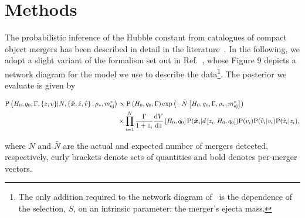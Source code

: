 \documentclass[%
 reprint,
 superscriptaddress,
 nofootinbib,
 amsmath,amssymb,
 aps,
]{revtex4-2}
\newcommand{\hubble}{\ensuremath{H_0}}
\newcommand{\decel}{\ensuremath{q_0}}
\newcommand{\prob}{\ensuremath{{\rm P}}}
\newcommand{\nexp}{\bar{N}}
\newcommand{\snrmin}{\rho_*}
\newcommand{\mejmin}{m_{\rm ej}^*}
\newcommand{\dgw}{\hat{\bm{x}}}
\begin{document}

\section{Methods} \label{sec:methods}

The probabilistic inference of the Hubble constant from catalogues of compact object mergers has been described in detail in the literature~\cite{Schutz:1986,Dalal:2006,Nissanke_etal:2010,Taylor_etal:2012,Nissanke_etal:2013,Abbott_etal:2017a,Chen_etal:2018,Fishbach_etal:2018,Feeney_etal:2018,Mandel_etal:2018,Gray_etal:2019,Mortlock_etal:2019,Vitale_etal:2020}. In the following, we adopt a slight variant of the formalism set out in Ref.~\cite{Mortlock_etal:2019}, whose Figure 9 depicts a network diagram for the model we use to describe the data\footnote{The only addition required to the network diagram of~\cite{Mortlock_etal:2019} is the dependence of the selection, $S$, on an intrinsic parameter: the merger's ejecta mass.}. The posterior we evaluate is given by
\begin{widetext}
\begin{align}
\prob \left( \hubble, \decel, \Gamma, \{z, v\} | N, \left\{ \dgw, \hat{z}, \hat{v} \right\}, \snrmin, \mejmin \right) & \propto
\prob \left( \hubble, \decel, \Gamma \right) \exp \left( -\bar{N} \left[ \hubble, \decel, \Gamma, \snrmin, \mejmin \right] \right) \\
& \times \prod_{i = 1}^{N} \frac{\Gamma}{1 + z_i} \frac{{\rm d}V}{{\rm d}z} \left[ \hubble, \decel \right] \prob (\dgw_i | d \left[ z_i, \hubble, \decel \right]) \prob(v_i) \prob(\hat{v}_i | v_i) \prob(\hat{z}_i | z_i), \nonumber
\end{align}
\end{widetext}
%
%
where $N$ and $\nexp$ are the actual and expected number of mergers detected, respectively, curly brackets denote sets of quantities and bold denotes per-merger vectors.
\end{document}
